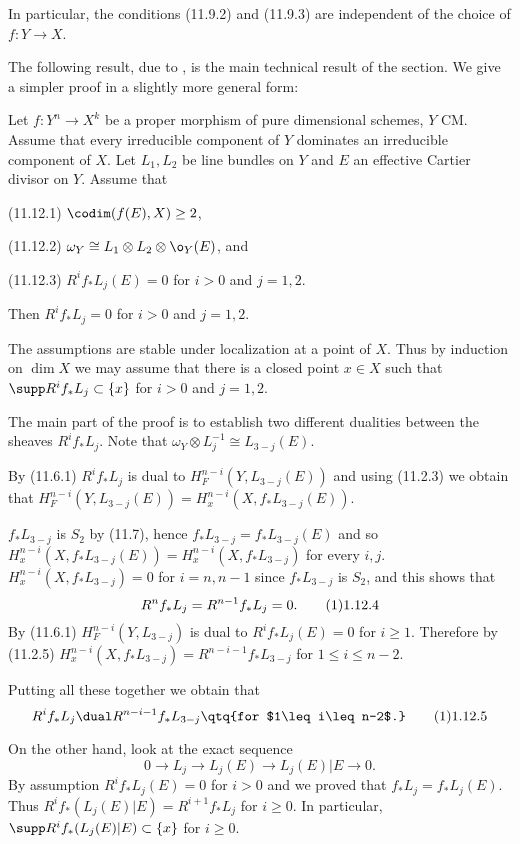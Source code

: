 In particular,  the conditions (11.9.2)  and (11.9.3) are independent of the 
choice of $f:Y\to X$.
\enddemo


The following result, due to \cite{Fujita85; KaMaMa87, 1-3}, is the main
technical result of the section.  We give a   simpler proof in a slightly more
general form: 
 

  Let $f:Y^n\to X^k$ be a proper morphism of pure
dimensional schemes, $Y$ CM. Assume that every irreducible
component of $Y$ dominates an irreducible component of $X$.  Let $L_1,L_2$ be line bundles on $Y$ and $E$
an effective Cartier divisor on $Y$. Assume that

(11.12.1)  $\codim (f(E),X)\geq 2$,

(11.12.2) $\omega_Y\cong L_1\otimes L_2\otimes \o_Y(E)$, and

(11.12.3) $R^if_*L_j(E)=0$ for $i>0$ and $j=1,2$.



\noindent Then $R^if_*L_j=0$ for $i>0$ and $j=1,2$.
\endproclaim

\demop The assumptions are stable under localization at a point of $X$. Thus by
induction on $\dim X$ we may assume that there is a closed point $x\in X$
such that $\supp R^if_*L_j\subset
\{x\}$ for $i>0$ and $j=1,2$.

The main part of the proof is to  establish two different dualities between the
sheaves 
$R^if_*L_j$. Note that $\omega_Y\otimes L_j^{-1}\cong L_{3-j}(E)$.

By (11.6.1) $R^if_*L_j$ is dual to $H^{n-i}_F(Y,L_{3-j}(E))$  and using
(11.2.3) we obtain that
$H^{n-i}_F(Y,L_{3-j}(E))=H^{n-i}_x(X,f_*L_{3-j}(E))$.

$f_*L_{3-j}$ is $S_2$ by (11.7), hence  $f_*L_{3-j}=f_*L_{3-j}(E)$ 
and so  $H^{n-i}_x(X,f_*L_{3-j}(E))=H^{n-i}_x(X,f_*L_{3-j})$ for every
$i,j$.  $H^{n-i}_x(X,f_*L_{3-j})=0$ for $i=n,n-1$ since $f_*L_{3-j}$ is $S_2$,
and this shows that
$$
R^nf_*L_j=R^{n-1}f_*L_j=0.\tag 11.12.4
$$
By (11.6.1) $H^{n-i}_F(Y,L_{3-j})$ is dual to $R^if_*L_j(E)=0$ for $i\geq 1$.
Therefore 
by (11.2.5)
$H^{n-i}_x(X,f_*L_{3-j})=R^{n-i-1}f_*L_{3-j}$ for $1\leq i\leq n-2$. 

Putting all these together we obtain that
$$
R^if_*L_j\dual R^{n-i-1}f_*L_{3-j}\qtq{for $1\leq i\leq n-2$.}\tag 11.12.5
$$

On the other hand, look at the exact sequence
$$
0\to L_j\to L_j(E)\to L_j(E)|E\to 0.
$$
By assumption $R^if_*L_j(E)=0$ for $i>0$ and we proved that 
$f_*L_j=f_*L_j(E)$. Thus $R^if_*( L_j(E)|E)=R^{i+1}f_* L_j$ for $i\geq 0$.
In particular, $\supp R^if_*( L_j(E)|E) \subset
\{x\}$ for $i\geq 0$.

